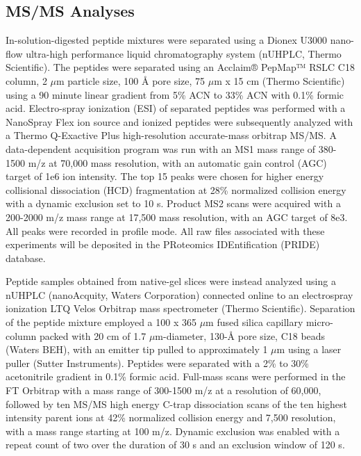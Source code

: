 \subsection{MS/MS Analyses}
In-solution-digested peptide mixtures were separated using a Dionex U3000 nano-flow ultra-high performance liquid chromatography system (nUHPLC, Thermo Scientific). The peptides were separated using an Acclaim® PepMap™ RSLC C18 column, 2 $\mu$m particle size, 100 Å pore size, 75 $\mu$m x 15 cm (Thermo Scientific) using a 90 minute linear gradient from 5\% ACN to 33\% ACN with 0.1\% formic acid. Electro-spray ionization (ESI) of separated peptides was performed with a NanoSpray Flex ion source and ionized peptides were subsequently analyzed with a Thermo Q-Exactive Plus high-resolution accurate-mass orbitrap MS/MS. A data-dependent acquisition program was run with an MS1 mass range of 380-1500 m/z at 70,000 mass resolution, with an automatic gain control (AGC) target of 1e6 ion intensity. The top 15 peaks were chosen for higher energy collisional dissociation (HCD) fragmentation at 28\% normalized collision energy with a dynamic exclusion set to 10 s. Product MS2 scans were acquired with a 200-2000 m/z mass range at 17,500 mass resolution, with an AGC target of 8e3. All peaks were recorded in profile mode. All raw files associated with these experiments will be deposited in the PRoteomics IDEntification (PRIDE) database.

Peptide samples obtained from native-gel slices were instead analyzed using a nUHPLC (nanoAcquity, Waters Corporation) connected online to an electrospray ionization LTQ Velos Orbitrap mass spectrometer (Thermo Scientific).  Separation of the peptide mixture employed a 100 x 365 $\mu$m fused silica capillary micro-column packed with 20 cm of 1.7 $\mu$m-diameter, 130-Å pore size, C18 beads (Waters BEH), with an emitter tip pulled to approximately 1 $\mu$m using a laser puller (Sutter Instruments).  Peptides were separated with a 2\% to 30\% acetonitrile gradient in 0.1\% formic acid.  Full-mass scans were performed in the FT Orbitrap with a mass range of 300-1500 m/z at a resolution of 60,000, followed by ten MS/MS high energy C-trap dissociation scans of the ten highest intensity parent ions at 42\% normalized collision energy and 7,500 resolution, with a mass range starting at 100 m/z.  Dynamic exclusion was enabled with a repeat count of two over the duration of 30 s and an exclusion window of 120 s.
